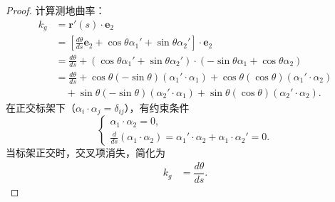 \documentclass[lang=cn,10pt,thmcnt=section]{elegantbook}
\begin{document}
\begin{proof}
    计算测地曲率：
    \begin{align*}
    k_g &= \mathbf{r}'(s) \cdot \mathbf{e}_2 \\
    &= \left[ \frac{d\theta}{ds} \mathbf{e}_2 + \cos\theta  \alpha_1' + \sin\theta  \alpha_2' \right] \cdot \mathbf{e}_2 \\
    &= \frac{d\theta}{ds} + \left( \cos\theta  \alpha_1' + \sin\theta  \alpha_2' \right) \cdot \left( -\sin\theta  \alpha_1 + \cos\theta  \alpha_2 \right) \\
    &= \frac{d\theta}{ds} + \cos\theta(-\sin\theta)(\alpha_1' \cdot \alpha_1) + \cos\theta(\cos\theta)(\alpha_1' \cdot \alpha_2) \\
    &\quad + \sin\theta(-\sin\theta)(\alpha_2' \cdot \alpha_1) + \sin\theta(\cos\theta)(\alpha_2' \cdot \alpha_2).
    \end{align*}
    在正交标架下（\(\alpha_i \cdot \alpha_j = \delta_{ij}\)），有约束条件
    \[
    \begin{cases}
    \alpha_1 \cdot \alpha_2 = 0, \\
    \frac{d}{ds}(\alpha_1 \cdot \alpha_2) = \alpha_1' \cdot \alpha_2 + \alpha_1 \cdot \alpha_2' = 0.
    \end{cases}
    \]
    当标架正交时，交叉项消失，简化为 
    \begin{align*}
    k_g &= \dfrac{d\theta}{ds}.
    \end{align*}
    

\end{proof}
\end{document}
